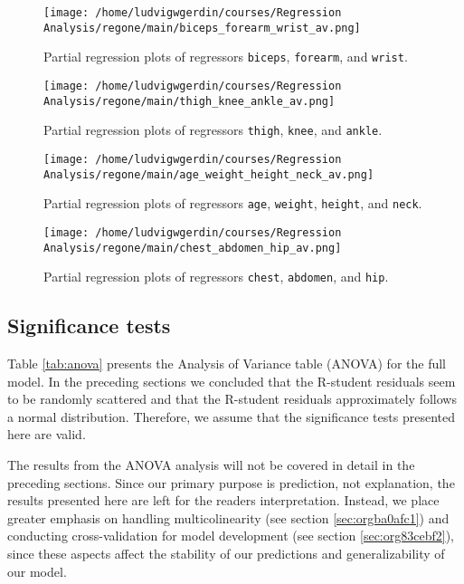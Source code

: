 \documentclass[11pt]{article}
\begin{document}
\begin{figure}[htbp]
\centering
\texttt{[image: /home/ludvigwgerdin/courses/Regression Analysis/regone/main/biceps\_forearm\_wrist\_av.png]}
\caption{\label{fig:org4cccd2f}
Partial regression plots of regressors \texttt{biceps}, \texttt{forearm}, and \texttt{wrist}.}
\end{figure}   

\begin{figure}[htbp]
\centering
\texttt{[image: /home/ludvigwgerdin/courses/Regression Analysis/regone/main/thigh\_knee\_ankle\_av.png]}
\caption{\label{fig:org16952ae}
Partial regression plots of regressors \texttt{thigh}, \texttt{knee}, and \texttt{ankle}.}
\end{figure}

\begin{figure}[htbp]
\centering
\texttt{[image: /home/ludvigwgerdin/courses/Regression Analysis/regone/main/age\_weight\_height\_neck\_av.png]}
\caption{\label{fig:org13f8e23}
Partial regression plots of regressors \texttt{age}, \texttt{weight}, \texttt{height}, and \texttt{neck}.}
\end{figure}

\begin{figure}[htbp]
\centering
\texttt{[image: /home/ludvigwgerdin/courses/Regression Analysis/regone/main/chest\_abdomen\_hip\_av.png]}
\caption{\label{fig:org28c13b2}
Partial regression plots of regressors \texttt{chest}, \texttt{abdomen}, and \texttt{hip}.}
\end{figure}

\subsection{Significance tests}
\label{sec:org9b246f5}

Table \ref{tab:anova} presents the Analysis of Variance table (ANOVA) for the full model. In the 
preceding sections we concluded that the R-student residuals seem to be randomly scattered and 
that the R-student residuals approximately follows a normal distribution. Therefore, we assume 
that the significance tests presented here are valid. 

The results from the ANOVA analysis will not be covered in detail in the preceding sections. Since
our primary purpose is prediction, not explanation, the results presented here are left for the 
readers interpretation. Instead, we place greater emphasis on handling multicolinearity 
(see section \ref{sec:orgba0afc1}) and conducting
cross-validation for model development (see section \ref{sec:org83cebf2}),
since these aspects affect the stability of our predictions and generalizability of our model.
\end{document}
